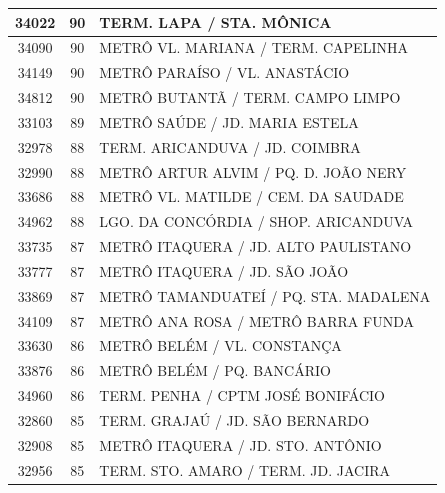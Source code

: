 \documentclass[
	12pt,				%
	oneside,			%
	a4paper,			%
	english,			%
	brazil				%
	]{abntex2ppgsi}
\begin{document}
\begin{apendicesenv}
\begin{longtable}{c|c|p{7cm}}
    34022 & 90    & TERM. LAPA / STA. MÔNICA \\
\hline

    34090 & 90    & METRÔ VL. MARIANA / TERM. CAPELINHA \\
\hline

    34149 & 90    & METRÔ PARAÍSO / VL. ANASTÁCIO \\
\hline

    34812 & 90    & METRÔ BUTANTÃ / TERM. CAMPO LIMPO \\
\hline

    33103 & 89    & METRÔ SAÚDE / JD. MARIA ESTELA \\
\hline

    32978 & 88    & TERM. ARICANDUVA / JD. COIMBRA \\
\hline

    32990 & 88    & METRÔ ARTUR ALVIM / PQ. D. JOÃO NERY \\
\hline

    33686 & 88    & METRÔ VL. MATILDE / CEM. DA SAUDADE \\
\hline

    34962 & 88    & LGO. DA CONCÓRDIA / SHOP. ARICANDUVA \\
\hline

    33735 & 87    & METRÔ ITAQUERA / JD. ALTO PAULISTANO \\
\hline

    33777 & 87    & METRÔ ITAQUERA / JD. SÃO JOÃO \\
\hline

    33869 & 87    & METRÔ TAMANDUATEÍ / PQ. STA. MADALENA \\
\hline

    34109 & 87    & METRÔ ANA ROSA / METRÔ BARRA FUNDA \\
\hline

    33630 & 86    & METRÔ BELÉM / VL. CONSTANÇA \\
\hline

    33876 & 86    & METRÔ BELÉM / PQ. BANCÁRIO \\
\hline

    34960 & 86    & TERM. PENHA / CPTM JOSÉ BONIFÁCIO \\
\hline

    32860 & 85    & TERM. GRAJAÚ / JD. SÃO BERNARDO \\
\hline

    32908 & 85    & METRÔ ITAQUERA / JD. STO. ANTÔNIO \\
\hline

    32956 & 85    & TERM. STO. AMARO / TERM. JD. JACIRA \\
\hline


\end{longtable}
\end{apendicesenv}
\end{document}
